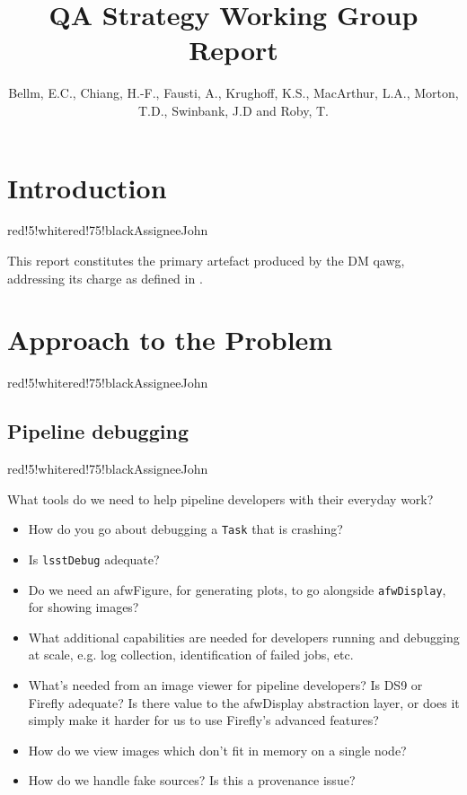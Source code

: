 \documentclass[DM,authoryear,toc,lsstdraft]{lsstdoc}
\title{QA Strategy Working Group Report}
\author{%
Bellm, E.C.,
Chiang, H.-F.,
Fausti, A.,
Krughoff, K.S.,
MacArthur, L.A.,
Morton, T.D.,
Swinbank, J.D and
Roby, T.
}
\date{\vcsDate}
\begin{document}
\newcommand{\assign}[1]{
  \begin{admonition}{red!5!white}{red!75!black}{Assignee}{}#1\end{admonition}
}

\maketitle

\section{Introduction}
\label{sec:intro}

\assign{John}

This report constitutes the primary artefact produced by the DM \gls{qawg},
addressing its charge as defined in .

\section{Approach to the Problem}

\assign{John}

\subsection{Pipeline debugging}

\assign{John}

What tools do we need to help pipeline developers with their everyday work?

\begin{itemize}

  \item{How do you go about debugging a \texttt{Task} that is crashing?}
  \item{Is \texttt{lsstDebug} adequate?}
  \item{Do we need an afwFigure, for generating plots, to go alongside \texttt{afwDisplay}, for showing images?}
  \item{What additional capabilities are needed for developers running and debugging at scale, e.g. log collection, identification of failed jobs, etc.}
  \item{What's needed from an image viewer for pipeline developers? Is DS9 or Firefly adequate? Is there value to the afwDisplay abstraction layer, or does it simply make it harder for us to use Firefly's advanced features?}
  \item{How do we view images which don't fit in memory on a single node?}
  \item{How do we handle fake sources? Is this a provenance issue?}

\end{itemize}
\end{document}
